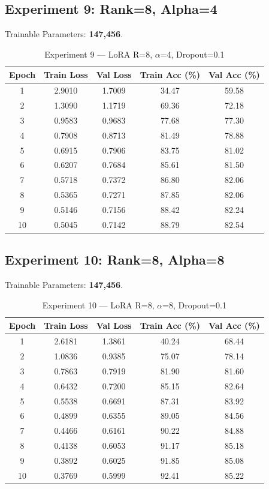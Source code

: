 \documentclass[12pt,a4paper]{article}
\begin{document}
\subsection{Experiment 9: Rank=8, Alpha=4}
Trainable Parameters: \textbf{147,456}.

\begin{table}[H]
\centering
\caption{Experiment 9 --- LoRA R=8, $\alpha$=4, Dropout=0.1}
\small
\begin{tabular}{ccccc}
\toprule
Epoch & Train Loss & Val Loss & Train Acc (\%) & Val Acc (\%) \\
\midrule
1  & 2.9010 & 1.7009 & 34.47 & 59.58 \\
2  & 1.3090 & 1.1719 & 69.36 & 72.18 \\
3  & 0.9583 & 0.9683 & 77.68 & 77.30 \\
4  & 0.7908 & 0.8713 & 81.49 & 78.88 \\
5  & 0.6915 & 0.7906 & 83.75 & 81.02 \\
6  & 0.6207 & 0.7684 & 85.61 & 81.50 \\
7  & 0.5718 & 0.7372 & 86.80 & 82.06 \\
8  & 0.5365 & 0.7271 & 87.85 & 82.06 \\
9  & 0.5146 & 0.7156 & 88.42 & 82.24 \\
10 & 0.5045 & 0.7142 & 88.79 & 82.54 \\
\bottomrule
\end{tabular}
\end{table}

\subsection{Experiment 10: Rank=8, Alpha=8}
Trainable Parameters: \textbf{147,456}.

\begin{table}[H]
\centering
\caption{Experiment 10 --- LoRA R=8, $\alpha$=8, Dropout=0.1}
\small
\begin{tabular}{ccccc}
\toprule
Epoch & Train Loss & Val Loss & Train Acc (\%) & Val Acc (\%) \\
\midrule
1  & 2.6181 & 1.3861 & 40.24 & 68.44 \\
2  & 1.0836 & 0.9385 & 75.07 & 78.14 \\
3  & 0.7863 & 0.7919 & 81.90 & 81.60 \\
4  & 0.6432 & 0.7200 & 85.15 & 82.64 \\
5  & 0.5538 & 0.6691 & 87.31 & 83.92 \\
6  & 0.4899 & 0.6355 & 89.05 & 84.56 \\
7  & 0.4466 & 0.6161 & 90.22 & 84.88 \\
8  & 0.4138 & 0.6053 & 91.17 & 85.18 \\
9  & 0.3892 & 0.6025 & 91.85 & 85.08 \\
10 & 0.3769 & 0.5999 & 92.41 & 85.22 \\
\bottomrule
\end{tabular}
\end{table}
\end{document}
